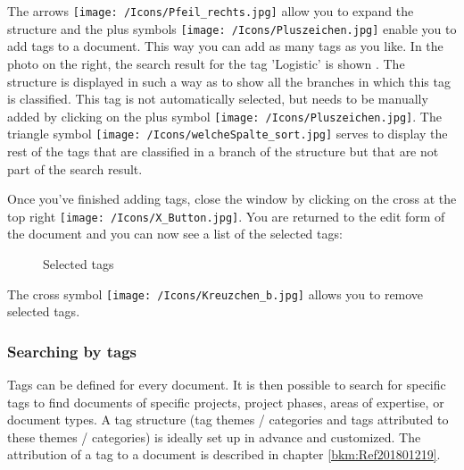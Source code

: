 The arrows \texttt{[image: /Icons/Pfeil\_rechts.jpg]} allow you to expand the structure and the plus symbols \texttt{[image: /Icons/Pluszeichen.jpg]} enable you to add tags to a document. This way you can add as many tags as you like. In the photo on the right, the search result for the tag 'Logistic' is shown . The structure is displayed in such a way as to show all the branches in which this tag is classified. This tag is not automatically selected, but needs to be manually added by clicking on the plus symbol \texttt{[image: /Icons/Pluszeichen.jpg]}. The triangle symbol \texttt{[image: /Icons/welcheSpalte\_sort.jpg]} serves to display the rest of the tags that are classified in a branch of the structure but that are not part of the search result. \newline

Once you've finished adding tags, close the window by clicking on the cross at the top right \texttt{[image: /Icons/X\_Button.jpg]}. You are returned to the edit form of the document and you can now see a list of the selected tags:

\begin{figure}[H]
\caption{Selected tags}
\end{figure}

The cross symbol \texttt{[image: /Icons/Kreuzchen\_b.jpg]}  allows you to remove selected tags.




\subsubsection{Searching by tags}
\label{bkm:Ref442275849}

Tags can be defined for every document. It is then possible to search for specific tags to find documents of specific projects, project phases, areas of expertise, or document types. A tag structure (tag themes / categories and tags attributed to these themes / categories) is ideally set up in advance and customized. The attribution of a tag to a document is described in chapter \ref{bkm:Ref201801219}.

